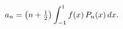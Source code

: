 \[a_{n}=\left(n+\tfrac{1}{2}\right)\int_{-1}^{1}f(x)\mathop{P_{n}\/}\nolimits\!%
\left(x\right)dx.\]